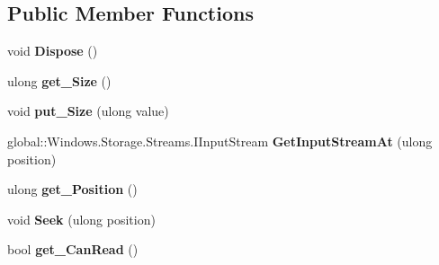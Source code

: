 \subsection*{Public Member Functions}
\begin{DoxyCompactItemize}
\item 
\mbox{\label{class_windows_1_1_storage_1_1_streams_1_1_in_memory_random_access_stream_a46eac03da7bc9cadfb0e54b02113e49d}} 
void {\bfseries Dispose} ()
\item 
\mbox{\label{class_windows_1_1_storage_1_1_streams_1_1_in_memory_random_access_stream_aa647257f534704ae03fa50c86a98f839}} 
ulong {\bfseries get\+\_\+\+Size} ()
\item 
\mbox{\label{class_windows_1_1_storage_1_1_streams_1_1_in_memory_random_access_stream_ac8b380272b33f6167715e900ce8b155f}} 
void {\bfseries put\+\_\+\+Size} (ulong value)
\item 
\mbox{\label{class_windows_1_1_storage_1_1_streams_1_1_in_memory_random_access_stream_a4eb2c7faf4803409163b311c912a083b}} 
global\+::\+Windows.\+Storage.\+Streams.\+I\+Input\+Stream {\bfseries Get\+Input\+Stream\+At} (ulong position)
\item 
\mbox{\label{class_windows_1_1_storage_1_1_streams_1_1_in_memory_random_access_stream_a60db0cabd4922fd35bbb2d64a7b381f1}} 
ulong {\bfseries get\+\_\+\+Position} ()
\item 
\mbox{\label{class_windows_1_1_storage_1_1_streams_1_1_in_memory_random_access_stream_a9dca3616e54f1113bfe6b6705612182b}} 
void {\bfseries Seek} (ulong position)
\item 
\mbox{\label{class_windows_1_1_storage_1_1_streams_1_1_in_memory_random_access_stream_aa39fd9f2f1b3be1d9282cff918d74651}} 
bool {\bfseries get\+\_\+\+Can\+Read} ()

\end{DoxyCompactItemize}
